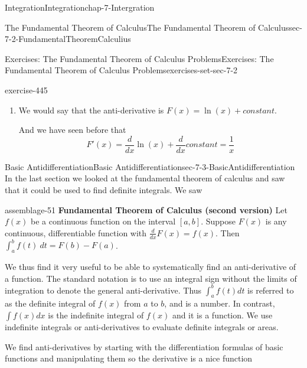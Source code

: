 \documentclass[oneside,10pt,]{book}
\newcommand{\terminology}[1]{\textbf{#1}}
\numberwithin{equation}{section}
\begin{document}
\begin{chapterptx}{Integration}{}{Integration}{}{}{chap-7-Intergration}
\begin{sectionptx}{The Fundamental Theorem of Calculus}{}{The Fundamental Theorem of Calculus}{}{}{sec-7-2-FundamentalTheoremCalculius}
\begin{exercises-subsection-numberless}{Exercises: The Fundamental Theorem of Calculus Problems}{}{Exercises: The Fundamental Theorem of Calculus Problems}{}{}{exercises-set-sec-7-2}
\begin{divisionexercise}{11}{}{}{exercise-445}
\begin{enumerate}[label=(\alph*)]
\begin{sidebyside}{1}{0}{0}{0}
\begin{sbspanel}{1}
\end{sbspanel}%
\end{sidebyside}%
\par
\hypertarget{p-2718}{}%
Rounding off the coefficients, we would have that%
%
\begin{equation*}
F(x) = ln(x) 
\end{equation*}
\item\hypertarget{li-753}{}\hypertarget{p-2719}{}%
We would say that the anti-derivative is \(F(x)=\ln(x)+constant\).%
\par
\hypertarget{p-2720}{}%
And we have seen before that%
%
\begin{equation*}
F'(x)=\frac{d}{dx}  \ln(x)+\frac{d}{dx} constant=\frac{1}{x}
\end{equation*}
\end{enumerate}
\end{divisionexercise}%
\end{exercises-subsection-numberless}
\end{sectionptx}
%
%
\typeout{************************************************}
\typeout{************************************************}
%
\begin{sectionptx}{Basic Antidifferentiation}{}{Basic Antidifferentiation}{}{}{sec-7-3-BasicAntidifferentiation}
\hypertarget{p-2721}{}%
In the last section we looked at the fundamental theorem of calculus and saw that it could be used to find definite integrals.  We saw%
\begin{assemblage}{}{assemblage-51}%
\hypertarget{p-2722}{}%
\terminology{Fundamental Theorem of Calculus (second version)} Let \(f(x)\) be a continuous function on the interval \([a, b]\).  Suppose \(F(x)\) is any continuous,  differentiable function with \(\frac{d}{dx} F(x)=f(x)\).  Then \(\int_a^b f(t)\ dt=F(b)-F(a)\).%
\end{assemblage}
\hypertarget{p-2723}{}%
We thus find it very useful to be able to systematically find an anti-derivative of a function.  The standard notation is to use an integral sign without the limits of integration to denote the general anti-derivative. Thus \(\int_a^b f(t)dt\) is referred to as the definite integral of \(f(x)\) from \(a\) to \(b\),  and is a number.  In contrast, \(\int f(x) dx\) is the indefinite integral of \(f(x)\) and it is a function.  We use indefinite integrals or anti-derivatives to evaluate definite integrals or areas.%
\par
\hypertarget{p-2724}{}%
We find anti-derivatives by starting with the differentiation formulas of basic functions and manipulating them so the derivative is a nice function%

\end{sectionptx}
\end{chapterptx}
\end{document}
